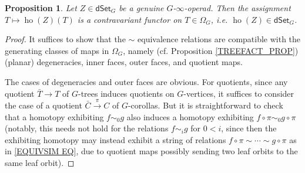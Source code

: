 \documentclass[a4paper,10pt
,draft
]{article}%
\numberwithin{equation}{section}
\numberwithin{figure}{section}
\newtheorem{proposition}[equation]{Proposition}%
\theoremstyle{definition} %
\newcommand{\1}{\ensuremath{\mathbbm 1}}%
\begin{document}
\begin{proposition}
	Let $Z \in \mathsf{dSet}_G$ be a genuine $G$-$\infty$-operad. Then the assignment 
	$T \mapsto \mathop{\mathrm{ho}}(Z)(T)$
	is a contravariant functor on $T \in \Omega_G$, i.e.
	$\mathop{\mathrm{ho}}(Z) \in \mathsf{dSet}_G$.
\end{proposition}

\begin{proof}
	It suffices to show that the $\sim$ equivalence relations are compatible with the generating classes of maps in $\Omega_G$, namely 
	(cf. Proposition \ref{TREEFACT_PROP})
	(planar) degeneracies, inner faces, outer faces, and quotient maps.
	
	The cases of degeneracies and outer faces are obvious. 
	For quotients, 
	since any quotient $\bar{T} \to T$ of $G$-trees induces quotients on $G$-vertices, it suffices to consider the case of a quotient
	$\bar{C} \xrightarrow{\pi} C$ of $G$-corollas.
	But it is straightforward to check that a homotopy exhibiting $f \sim_0 g$ also induces a homotopy exhibiting 
	$f \circ \pi \sim_0 g \circ \pi$
	(notably, this needs not hold for the relations $f \sim_i g$ for $0<i$, 
	since then the exhibiting homotopy 
	may instead exhibit a string of relations 
	$f \circ \pi \sim \cdots \sim g \circ \pi$
	as in \eqref{EQUIVSIM EQ},
	due to quotient maps possibly sending two leaf orbits to the same leaf orbit).


\end{proof}
\end{document}
